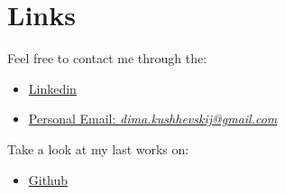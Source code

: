 \section{Links}

Feel free to contact me through the:
\begin{itemize}
    \item \href{https://www.linkedin.com/in/dkushchevskyi/}{Linkedin}
    \item \href{mailto:dima.kushhevskij@gmail.com}{Personal Email: \textit{dima.kushhevskij@gmail.com}}
\end{itemize}

Take a look at my last works on:
\begin{itemize}
    \item \href{https://github.com/dkushche}{Github}
\end{itemize}
